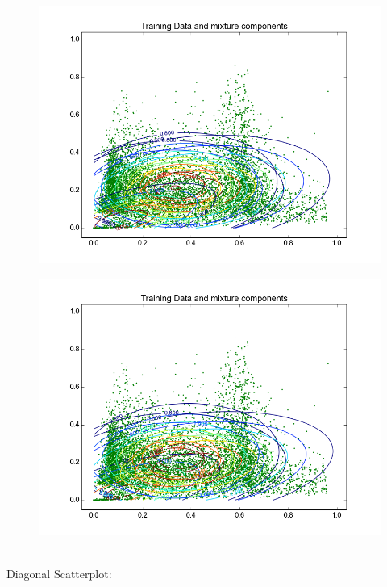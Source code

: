 \documentclass[11pt,a4paper]{article}
\begin{document}
\begin{minipage}[b]{0.25\textwidth}
\begin{figure}[H]
  \centering
  \includegraphics[width=.8\linewidth]{Figures/contoursstreet15.png}

  \label{fig:sfig1}
\end{figure}%
\end{minipage}
\begin{minipage}[b]{0.25\textwidth}
\begin{figure}[H]
  \centering
  \includegraphics[width=.8\linewidth]{Figures/contoursstreet30.png}

  \label{fig:sfig1}
\end{figure}%
\end{minipage}
\\
Diagonal Scatterplot: \\
\end{document}
